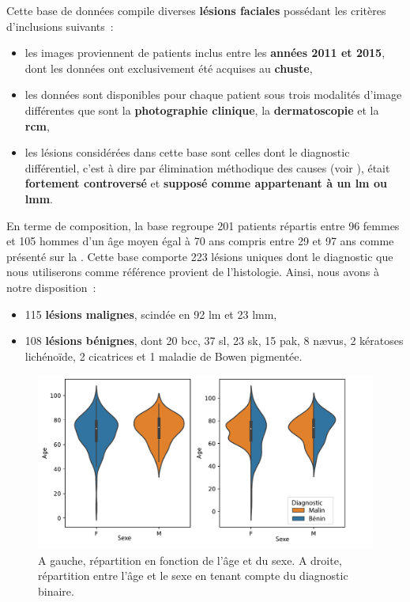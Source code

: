 Cette base de données compile diverses \textbf{lésions faciales} possédant les critères d'inclusions suivants~:
\begin{itemize}
    \item les images proviennent de patients inclus entre les \textbf{années 2011 et 2015}, dont les données ont exclusivement été acquises au \textbf{\gls{chuste}},
    \item les données sont disponibles pour chaque patient sous trois modalités d'image différentes que sont la \textbf{photographie clinique}, la \textbf{dermatoscopie} et la \textbf{\gls{rcm}},
    \item les lésions considérées dans cette base sont celles dont le diagnostic différentiel, c'est à dire par élimination méthodique des causes (voir ), était \textbf{fortement controversé} et \textbf{supposé comme appartenant à un \gls{lm} ou \gls{lmm}}.
\end{itemize}\par

En terme de composition, la base regroupe 201 patients répartis entre 96 femmes et 105 hommes d'un âge moyen égal à 70 ans compris entre 29 et 97 ans comme présenté sur la . Cette base comporte 223 lésions uniques dont le diagnostic que nous utiliserons comme référence provient de l'histologie. Ainsi, nous avons à notre disposition~:
\begin{itemize}
    \item 115 \textbf{lésions malignes}, scindée en 92 \gls{lm} et 23 \gls{lmm},
    \item 108 \textbf{lésions bénignes}, dont 20 \gls{bcc}, 37 \gls{sl}, 23 \gls{sk}, 15 \gls{pak}, 8 nævus, 2 kératoses lichénoïde, 2 cicatrices et 1 maladie de Bowen pigmentée.
\end{itemize}\par

\begin{figure}[H]
    \centering
    \includegraphics[width=0.8\linewidth]{contents/chapter_3_1/resources/statistics_age_sex.pdf}
    \caption{A gauche, répartition en fonction de l'âge et du sexe. A droite, répartition entre l'âge et le sexe en tenant compte du diagnostic binaire.}
    \label{fig:statistics_age_sex}
\end{figure}\par

